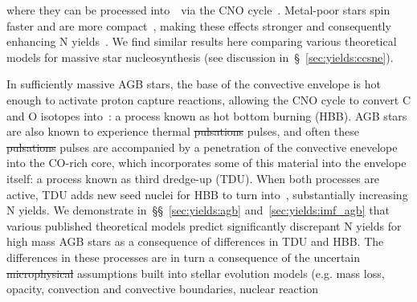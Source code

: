 \documentclass[ms.tex]{subfiles}
\begin{document}
where they can be processed into~\Nfourteen~via the CNO cycle~\citep{Heger2010,
Frischknecht2016, Andrews2017}.
Metal-poor stars spin faster and are more compact~\citep*{Maeder1999}, making
these effects stronger and consequently enhancing N yields~\citep*{Meynet2002a,
Meynet2002b, Meynet2006}.
We find similar results here comparing various theoretical models for massive
star nucleosynthesis (see discussion in~\S~\ref{sec:yields:ccsne}).
\par
In sufficiently massive AGB stars, the base of the convective envelope is hot
enough to activate proton capture reactions, allowing the CNO cycle to convert
C and O isotopes into~\Nfourteen: a process known as hot bottom burning (HBB).
AGB stars are also known to experience thermal {\color{red} \sout{pulsations}
pulses}, and often these {\color{red} \sout{pulsations} pulses}
are accompanied by a penetration of the convective enevelope into the
CO-rich core, which incorporates some of this material into the envelope
itself: a process known as third dredge-up (TDU).
When both processes are active, TDU adds new seed nuclei for HBB to turn
into~\Nfourteen, substantially increasing N yields.
We demonstrate in~\S\S~\ref{sec:yields:agb} and~\ref{sec:yields:imf_agb} that
various published theoretical models predict significantly discrepant N yields
for high mass AGB stars as a consequence of differences in TDU and
HBB.
The differences in these processes are in turn a consequence of the uncertain
{\color{red} \sout{microphysical}} assumptions built into stellar evolution
models (e.g. mass
loss, opacity, convection and convective boundaries, nuclear reaction
\end{document}
